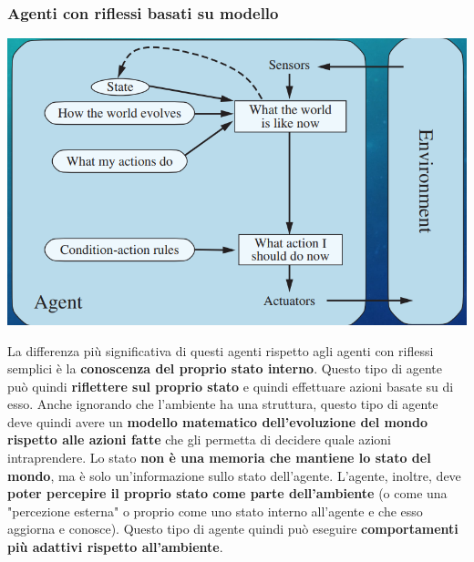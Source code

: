\documentclass[12pt]{article}
\begin{document}
\subsubsection{Agenti con riflessi basati su modello}
\begin{center}
    \includegraphics[width = 0.70\linewidth]{Images/11.PNG}
\end{center}
La differenza più significativa di questi agenti rispetto agli agenti con riflessi semplici è la \textbf{conoscenza del proprio stato interno}.
Questo tipo di agente può quindi \textbf{riflettere sul proprio stato} e quindi effettuare azioni basate su di esso.
Anche ignorando che l'ambiente ha una struttura, questo tipo di agente deve quindi avere un \textbf{modello matematico dell'evoluzione del mondo rispetto alle azioni fatte} che gli permetta
di decidere quale azioni intraprendere. Lo stato \textbf{non è una memoria che mantiene lo stato del mondo}, ma è solo un'informazione sullo stato dell'agente.
L'agente, inoltre, deve \textbf{poter percepire il proprio stato come parte dell'ambiente} (o come una "percezione esterna" o proprio come uno stato interno all'agente e che esso aggiorna e conosce).
Questo tipo di agente quindi può eseguire \textbf{comportamenti più adattivi rispetto all'ambiente}.
\end{document}
